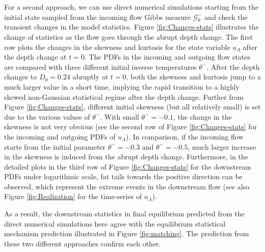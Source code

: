 \documentclass[9pt,twocolumn,twoside,lineno]{pnas-new}
\begin{document}
For a second approach, we can use direct numerical simulations starting
from the initial state sampled from the incoming flow Gibbs measure
$\mathcal{G}_{\theta}^{-}$ and check the transient changes in the
model statistics. Figure \ref{fig:Changes-stats} illustrates the
change of statistics as the flow goes through the abrupt depth change.
The first row plots the changes in the skewness and kurtosis for the
state variable $u_{\Lambda}$ after the depth change at $t=0$. The
PDFs in the incoming and outgoing flow states are compared with three different
initial inverse temperatures $\theta^{-}$. After the depth changes
to $D_{0}=0.24$ abruptly at $t=0$, both the skewness and kurtosis
jump to a much larger value in a short time, implying the rapid transition
to a highly skewed non-Gaussian statistical regime after the depth
change. Further from Figure \ref{fig:Changes-stats}, different initial
skewness (but all relatively small) is set due to the various values
of $\theta^{-}$. With small $\theta^{-}=-0.1$, the change in the
skewness is not very obvious (see the second row of Figure \ref{fig:Changes-stats}
for the incoming and outgoing PDFs of $u_{\Lambda}$). In comparison,
if the incoming flow starts from the initial parameter $\theta^{-}=-0.3$
and $\theta^{-}=-0.5$, much larger increase in the skewness is induced
from the abrupt depth change. Furthermore, in the detailed plots in
the third row of Figure \ref{fig:Changes-stats} for the downstream PDFs
under logarithmic scale, fat tails towards the positive direction
can be observed, which represent the extreme events in the downstream
flow (see also Figure \ref{fig:Realization} for the time-series of
$u_{\Lambda}$).

As a result, the downstream statistics in final equilibrium predicted
from the direct numerical simulations here agree with the equilibrium
statistical mechanism prediction illustrated in Figure \ref{fig:matching}. The prediction from these two different approaches
confirm each other.
\end{document}
